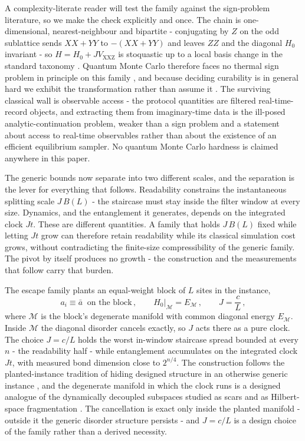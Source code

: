 A complexity-literate reader will test the family against the sign-problem literature, so we make the check explicitly and once. The chain is one-dimensional, nearest-neighbour and bipartite - conjugating by $Z$ on the odd sublattice sends $XX + YY$ to $-(XX + YY)$ and leaves $ZZ$ and the diagonal $H_{0}$ invariant - so $H = H_{0} + J V_{\mathrm{XXZ}}$ is stoquastic up to a local basis change in the standard taxonomy \cite{bravyi2008stoquastic, klassen2019stoquastic}. Quantum Monte Carlo therefore faces no thermal sign problem in principle on this family \cite{troyer2005computational}, and because deciding curability is in general hard we exhibit the transformation rather than assume it \cite{marvian2019cure, klassen2019hardness, hangleiter2020easing}. The surviving classical wall is observable access - the protocol quantities are filtered real-time-record objects, and extracting them from imaginary-time data is the ill-posed analytic-continuation problem, weaker than a sign problem and a statement about access to real-time observables rather than about the existence of an efficient equilibrium sampler. No quantum Monte Carlo hardness is claimed anywhere in this paper.

The generic bounds now separate into two different scales, and the separation is the lever for everything that follows. Readability constrains the instantaneous splitting scale $J\,B(L)$ - the staircase must stay inside the filter window at every size. Dynamics, and the entanglement it generates, depends on the integrated clock $Jt$. These are different quantities. A family that holds $J\,B(L)$ fixed while letting $Jt$ grow can therefore retain readability while its classical simulation cost grows, without contradicting the finite-size compressibility of the generic family. The pivot by itself produces no growth - the construction and the measurements that follow carry that burden.

The escape family plants an equal-weight block of $L$ sites in the instance,
\begin{equation}\label{def:planted-block}
a_{i} \equiv \bar{a} \ \text{ on the block}\,, \qquad H_{0}\big|_{\mathcal{M}} = E_{\mathcal{M}}\,, \qquad J = \frac{c}{L}\,,
\end{equation}
where $\mathcal{M}$ is the block's degenerate manifold with common diagonal energy $E_{\mathcal{M}}$. Inside $\mathcal{M}$ the diagonal disorder cancels exactly, so $J$ acts there as a pure clock. The choice $J = c/L$ holds the worst in-window staircase spread bounded at every $n$ - the readability half - while entanglement accumulates on the integrated clock $Jt$, with measured bond dimension close to $2^{n/4}$. The construction follows the planted-instance tradition of hiding designed structure in an otherwise generic instance \cite{barthel2002planted}, and the degenerate manifold in which the clock runs is a designed analogue of the dynamically decoupled subspaces studied as scars and as Hilbert-space fragmentation \cite{turner2018scars, sala2020fragmentation}. The cancellation is exact only inside the planted manifold - outside it the generic disorder structure persists - and $J = c/L$ is a design choice of the family rather than a derived necessity.

